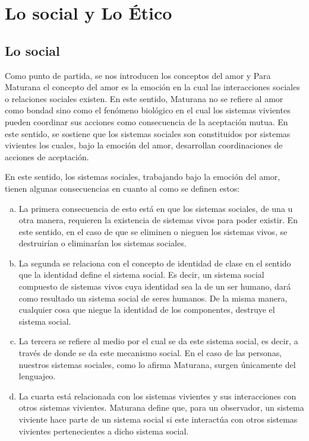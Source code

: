 \documentclass[10pt]{article}
\begin{document}
    \section{Lo social y Lo Ético}

        \subsection{Lo social}

        Como punto de partida, se nos introducen los conceptos del amor y Para Maturana el concepto del amor es la emoción en la cual las interacciones sociales o relaciones sociales existen. En este sentido, Maturana no se refiere al amor como bondad sino como el fenómeno biológico en el cual los sistemas vivientes pueden coordinar sus acciones como consecuencia de la aceptación mutua. En este sentido, se sostiene que los sistemas sociales son constituidos por sistemas vivientes los cuales, bajo la emoción del amor, desarrollan coordinaciones de acciones de aceptación.

        En este sentido, los sistemas sociales, trabajando bajo la emoción del amor, tienen algunas consecuencias en cuanto al como se definen estos:
        
        \begin{enumerate}[a)]
            \item La primera consecuencia de esto está en que los sistemas sociales, de una u otra manera, requieren la existencia de sistemas vivos para poder existir. En este sentido, en el caso de que se eliminen o nieguen los sistemas vivos, se destruirían o eliminarían los sistemas sociales.   
            
            \item La segunda se relaciona con el concepto de identidad de clase en el sentido que la identidad define el sistema social. Es decir, un sistema social compuesto de sistemas vivos cuya identidad sea la de un ser humano, dará como resultado un sistema social de seres humanos. De la misma manera, cualquier cosa que niegue la identidad de los componentes, destruye el sistema social.
            
            \item La tercera se refiere al medio por el cual se da este sistema social, es decir, a través de donde se da este mecanismo social. En el caso de las personas, nuestros sistemas sociales, como lo afirma Maturana, surgen únicamente del lenguajeo. 
            
            \item La cuarta está relacionada con los sistemas vivientes y sus interacciones con otros sistemas vivientes. Maturana define que, para un observador, un sistema viviente hace parte de un sistema social si este interactúa con otros sistemas vivientes pertenecientes a dicho sistema social.
            
        \end{enumerate}
\end{document}
